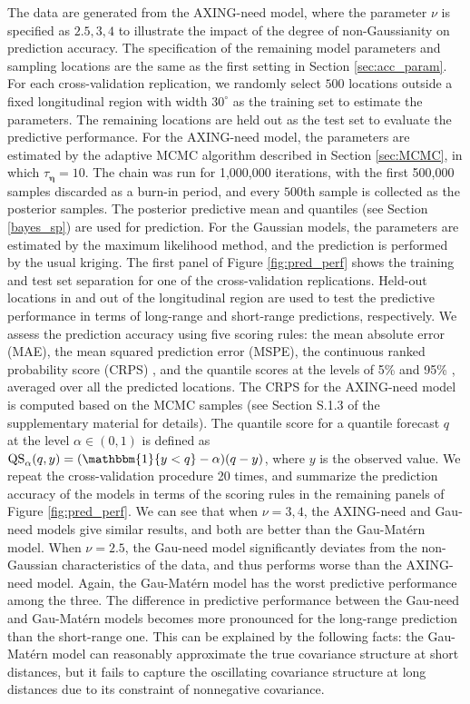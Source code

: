 \documentclass[aoas,preprint]{imsart}
\numberwithin{equation}{section}
\theoremstyle{plain}
\begin{document}
The data are generated from the AXING-need model, where the parameter $\nu$ is specified as $2.5, 3, 4$ to illustrate the impact of the degree of non-Gaussianity on prediction accuracy. The specification of the remaining model parameters and sampling locations are the same as the first setting in Section \ref{sec:acc_param}. For each cross-validation replication, we randomly select $500$ locations outside a fixed longitudinal region with width $30^\circ$ as the training set to estimate the parameters. The remaining locations are held out as the test set to evaluate the predictive performance. For the AXING-need model, the parameters are estimated by the adaptive MCMC algorithm described in Section \ref{sec:MCMC}, in which $\tau_{\bm{\eta}}=10$. The chain was run for 1,000,000 iterations, with the first 500,000 samples discarded as a burn-in period, and every $500$th sample is collected as the posterior samples.
The posterior predictive mean and quantiles (see Section \ref{bayes_sp}) are used for prediction.
For the Gaussian models, the parameters are estimated by the maximum likelihood method, and the prediction is performed by the usual kriging. The first panel of Figure \ref{fig:pred_perf} shows the training and test set separation for one of the cross-validation replications. Held-out locations in and out of the longitudinal region are used to test the predictive performance in terms of long-range and short-range predictions, respectively. We assess the prediction accuracy using five scoring rules: the mean absolute error (MAE), the mean squared prediction error (MSPE), the continuous ranked probability score (CRPS) \citep{Gneiting-07}, and the quantile scores at the levels of 5\% and 95\% \citep{gneiting-11}, averaged over all the predicted locations. The CRPS for the AXING-need model is computed based on the MCMC samples (see Section S.1.3 of the supplementary material \citet{Fan-17-supp} for details). The quantile score for a quantile forecast $q$ at the level $\alpha \in (0, 1)$ is defined as $\mbox{QS}_{\alpha}(q, y)=(\mathbbm{1}\{ y<q \}-\alpha)(q-y)$, where $y$ is the observed value. We repeat the cross-validation procedure 20 times, and summarize the prediction accuracy of the models in terms of the scoring rules in the remaining panels of Figure \ref{fig:pred_perf}. We can see that when $\nu=3, 4$, the AXING-need and Gau-need models give similar results, and both are better than the Gau-Mat\'ern model. When $\nu=2.5$, the Gau-need model significantly deviates from the non-Gaussian characteristics of the data, and thus performs worse than the AXING-need model. Again, the Gau-Mat\'ern model has the worst predictive performance among the three. The difference in predictive performance between the Gau-need and Gau-Mat\'ern models becomes more pronounced for the long-range prediction than the short-range one. This can be explained by the following facts: the Gau-Mat\'ern model can reasonably approximate the true covariance structure at short distances, but it fails to capture the oscillating covariance structure at long distances due to its constraint of nonnegative covariance. 
\end{document}
